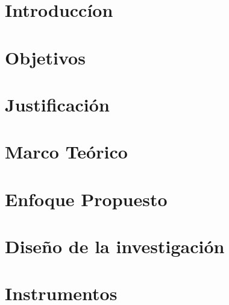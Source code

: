 \documentclass[journal]{IEEEtran}
\begin{document}



\maketitle





\section{Introduccíon}


\section{Objetivos}


\section{Justificación}


\section{Marco Teórico}


\section{Enfoque Propuesto}


\section{Diseño de la investigación}


\section{Instrumentos}

\end{document}
